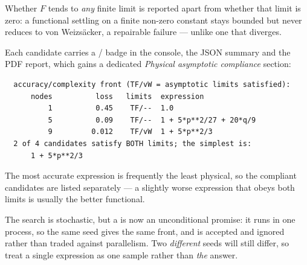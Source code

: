 Whether $F$ tends to \emph{any} finite limit is reported apart from whether
that limit is zero: a functional settling on a finite non-zero constant stays
bounded but never reduces to von Weizs\"acker, a repairable failure --- unlike
one that diverges.

Each candidate carries a / badge in the console, the JSON
summary and the PDF report, which gains a dedicated \emph{Physical asymptotic
compliance} section:

\begin{lstlisting}
  accuracy/complexity front (TF/vW = asymptotic limits satisfied):
      nodes          loss   limits  expression
          1          0.45    TF/--  1.0
          5          0.09    TF/--  1 + 5*p**2/27 + 20*q/9
          9         0.012    TF/vW  1 + 5*p**2/3
  2 of 4 candidates satisfy BOTH limits; the simplest is:
      1 + 5*p**2/3
\end{lstlisting}

The most accurate expression is frequently the least physical, so the compliant
candidates are listed separately --- a slightly worse expression that obeys
both limits is usually the better functional.

\begin{pnote}
The search is stochastic, but a  is now an unconditional promise: it
runs in one process, so the same seed gives the same front, and
 is accepted and ignored rather than traded against
parallelism. Two \emph{different} seeds will still differ, so treat a single
expression as one sample rather than \emph{the} answer.
\end{pnote}
